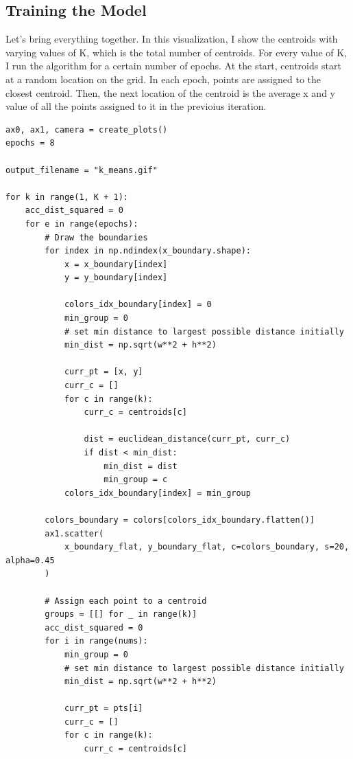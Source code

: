 \documentclass[openany]{book}
\begin{document}
    \subsection{Training the Model}\label{training-the-model}

Let's bring everything together. In this visualization, I show the
centroids with varying values of K, which is the total number of
centroids. For every value of K, I run the algorithm for a certain
number of epochs. At the start, centroids start at a random location on
the grid. In each epoch, points are assigned to the closest centroid.
Then, the next location of the centroid is the average x and y value of
all the points assigned to it in the previoius iteration.

\begin{tcolorbox}
\tiny
\begin{verbatim}
ax0, ax1, camera = create_plots()
epochs = 8

output_filename = "k_means.gif"

for k in range(1, K + 1):
    acc_dist_squared = 0
    for e in range(epochs):
        # Draw the boundaries
        for index in np.ndindex(x_boundary.shape):
            x = x_boundary[index]
            y = y_boundary[index]

            colors_idx_boundary[index] = 0
            min_group = 0
            # set min distance to largest possible distance initially
            min_dist = np.sqrt(w**2 + h**2)

            curr_pt = [x, y]
            curr_c = []
            for c in range(k):
                curr_c = centroids[c]

                dist = euclidean_distance(curr_pt, curr_c)
                if dist < min_dist:
                    min_dist = dist
                    min_group = c
            colors_idx_boundary[index] = min_group

        colors_boundary = colors[colors_idx_boundary.flatten()]
        ax1.scatter(
            x_boundary_flat, y_boundary_flat, c=colors_boundary, s=20, alpha=0.45
        )

        # Assign each point to a centroid
        groups = [[] for _ in range(k)]
        acc_dist_squared = 0
        for i in range(nums):
            min_group = 0
            # set min distance to largest possible distance initially
            min_dist = np.sqrt(w**2 + h**2)

            curr_pt = pts[i]
            curr_c = []
            for c in range(k):
                curr_c = centroids[c]


\end{verbatim}
\end{tcolorbox}
\end{document}

